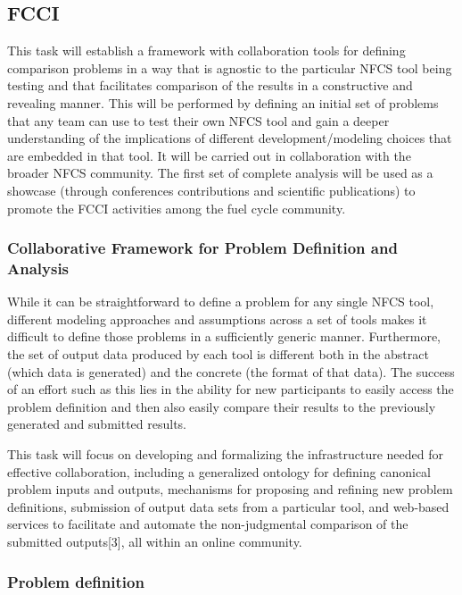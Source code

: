 
\subsection{FCCI}

This task will establish a framework with collaboration tools  for
defining comparison problems in a way that is agnostic to the particular NFCS
tool being testing and that facilitates comparison of the results in a
constructive and revealing manner. This will be performed  by defining an
initial set of problems that any team can use to test their own NFCS tool and
gain a deeper understanding of the implications of different
development/modeling choices that are embedded in that tool. It will be carried
out in collaboration with the broader NFCS community. The first set of complete
analysis will be used as a showcase (through conferences contributions and
scientific publications) to promote the FCCI activities among the fuel cycle
community. 


\subsubsection{Collaborative Framework for Problem Definition and Analysis} 

While it can be straightforward to define a problem for any single NFCS tool,
different modeling approaches and assumptions across a set of tools makes it
difficult to define those problems in a sufficiently generic manner.
Furthermore, the set of output data produced by each tool is different both in
the abstract (which data is generated) and the concrete (the format of that
data). The success of an effort such as this lies in the ability for new
participants to easily access the problem definition and then also easily
compare their results to the previously generated and submitted results.

This task will focus on developing and formalizing the infrastructure needed for
effective collaboration, including a generalized ontology for defining canonical
problem inputs and outputs, mechanisms for proposing and refining new problem
definitions, submission of output data sets from a particular tool, and
web-based services to facilitate and automate the non-judgmental comparison of
the submitted outputs[3], all within an online community. 


\subsubsection{Problem definition} 


